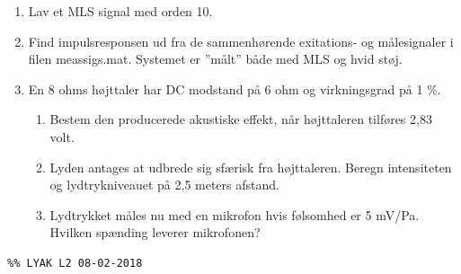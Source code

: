\begin{enumerate}
	\item Lav et MLS signal med orden 10.
	\item Find impulsresponsen ud fra de sammenhørende exitations- og målesignaler i filen meassigs.mat. Systemet er ”målt” både med MLS og hvid støj.
	\item En 8 ohms højttaler har DC modstand på 6 ohm og virkningsgrad på 1 \%.
	\begin{enumerate}
		\item Bestem den producerede akustiske effekt, når højttaleren tilføres 2,83 volt.
		\item Lyden antages at udbrede sig sfærisk fra højttaleren. Beregn intensiteten og lydtrykniveauet på 2,5 meters afstand.
		\item Lydtrykket måles nu med en mikrofon hvis følsomhed er 5 mV/Pa. Hvilken spænding leverer mikrofonen?
	\end{enumerate}
\end{enumerate}


\begin{lstlisting}
%% LYAK L2 08-02-2018

\end{lstlisting}

